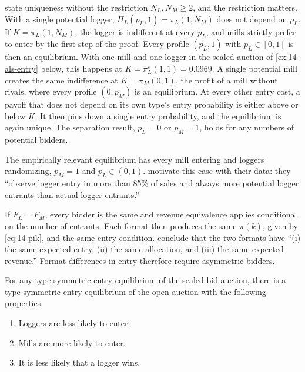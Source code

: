 \citet{AtheyLevinSeira2011} state uniqueness without the restriction $N_L,N_M\ge 2$, and the
restriction matters. With a single potential logger, $\Pi_L(p_L,1)=\pi_L(1,N_M)$ does not depend on
$p_L$. If $K=\pi_L(1,N_M)$, the logger is indifferent at every $p_L$, and mills strictly prefer to
enter by the first step of the proof. Every profile $(p_L,1)$ with $p_L\in[0,1]$ is then an
equilibrium. With one mill and one logger in the sealed auction of \cref{ex:14-als-entry} below, this
happens at $K=\pi_L^{\mathrm{s}}(1,1)=0.0969$. A single potential mill creates the same indifference at
$K=\pi_M(0,1)$, the profit of a mill without rivals, where every profile $(0,p_M)$ is an equilibrium.
At every other entry cost, a payoff that does not depend on its own type's entry probability is either
above or below $K$. It then pins down a single entry probability, and the equilibrium is again unique.
The separation result, $p_L=0$ or $p_M=1$, holds for any numbers of potential bidders.

The empirically relevant equilibrium has every mill entering and loggers randomizing,
$p_M=1$ and $p_L\in(0,1)$. \citet[Section II.C]{AtheyLevinSeira2011} motivate this case with their
data: they ``observe logger entry in more than 85\% of sales and always more potential logger
entrants than actual logger entrants.''

If $F_L=F_M$, every bidder is the same and revenue equivalence applies conditional on the number of
entrants. Each format then produces the same $\pi(k)$, given by \eqref{eq:14-pik}, and the same
entry condition. \citet[Section II.D]{AtheyLevinSeira2011} conclude that the two formats have
``(i) the same expected entry, (ii) the same allocation, and (iii) the same expected revenue.''
Format differences in entry therefore require asymmetric bidders.

\begin{proposition}\label{prop:14-entry-format}
For any type-symmetric entry equilibrium of the sealed bid auction, there is a type-symmetric entry
equilibrium of the open auction with the following properties.
\begin{enumerate}[label=(\roman*)]
\item Loggers are less likely to enter.
\item Mills are more likely to enter.
\item It is less likely that a logger wins.
\end{enumerate}
\end{proposition}

